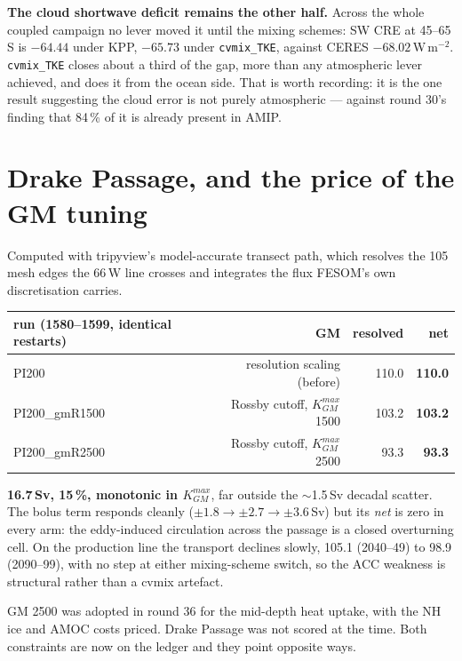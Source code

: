 \documentclass[10pt]{article}
\begin{document}
\textbf{The cloud shortwave deficit remains the other half.} Across the whole coupled
campaign no lever moved it until the mixing schemes: SW CRE at 45--65\,S is $-64.44$ under
KPP, $-65.73$ under \texttt{cvmix\_TKE}, against CERES $-68.02$\,W\,m$^{-2}$.
\texttt{cvmix\_TKE} closes about a third of the gap, more than any atmospheric lever
achieved, and does it from the ocean side. That is worth recording: it is the one result
suggesting the cloud error is not purely atmospheric --- against round 30's finding that
84\,\% of it is already present in AMIP.

\section{Drake Passage, and the price of the GM tuning}\label{sec:drake}

Computed with tripyview's model-accurate transect path, which resolves the 105 mesh edges
the 66\,W line crosses and integrates the flux FESOM's own discretisation carries.

\begin{center}\small
\begin{tabular}{lrrr}
\toprule
run (1580--1599, identical restarts) & GM & resolved & \textbf{net} \\
\midrule
PI200          & resolution scaling (before) & 110.0 & \textbf{110.0} \\
PI200\_gmR1500 & Rossby cutoff, $K_{GM}^{max}$ 1500 & 103.2 & \textbf{103.2} \\
PI200\_gmR2500 & Rossby cutoff, $K_{GM}^{max}$ 2500 & 93.3 & \textbf{93.3} \\
\bottomrule
\end{tabular}
\end{center}

\textbf{16.7\,Sv, 15\,\%, monotonic in $K_{GM}^{max}$}, far outside the $\sim$1.5\,Sv
decadal scatter. The bolus term responds cleanly ($\pm1.8\to\pm2.7\to\pm3.6$\,Sv) but its
\emph{net} is zero in every arm: the eddy-induced circulation across the passage is a
closed overturning cell. On the production line the transport declines slowly, 105.1
(2040--49) to 98.9 (2090--99), with no step at either mixing-scheme switch, so the ACC
weakness is structural rather than a cvmix artefact.

GM 2500 was adopted in round 36 for the mid-depth heat uptake, with the NH ice and AMOC
costs priced. Drake Passage was not scored at the time. Both constraints are now on the
ledger and they point opposite ways.
\end{document}
